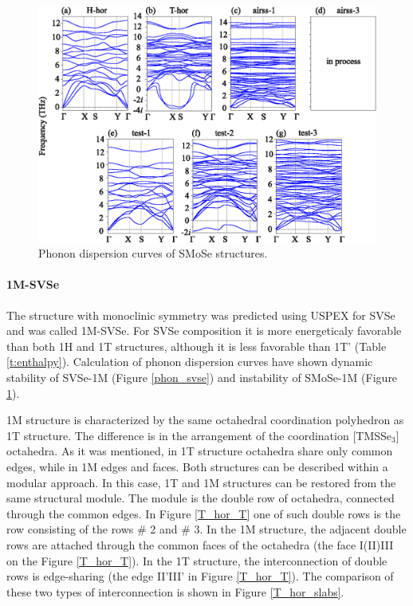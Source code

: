 \documentclass[a4paperm]{article}
\begin{document}
\begin{figure}[H]
	\includegraphics[width=\textwidth]{phon_smose.eps}
	\caption{Phonon dispersion curves of SMoSe structures.}
	\label{phon_smose}
\end{figure}







\paragraph{1M-SVSe}

The structure with monoclinic symmetry was predicted using USPEX for SVSe and was called 1M-SVSe. 
For SVSe composition it is more  energeticaly favorable than both 1H and 1T structures, although it is less favorable than 1T' (Table \ref{t:enthalpy}).
Calculation of phonon dispersion curves have shown dynamic stability of SVSe-1M (Figure \ref{phon_svse}) and instability of SMoSe-1M (Figure \ref{phon_smose}).

1M structure is characterized by the same octahedral coordination polyhedron as 1T structure.
The difference is in the arrangement of the coordination [TMSSe$_3$] octahedra.
As it was mentioned, in 1T structure octahedra share only common edges, while in 1M edges and faces.
Both structures can be described within a modular approach.
In this case, 1T and 1M structures can be restored from the same structural module.
The module is the double row of octahedra, connected through the common edges.
In Figure \ref{T_hor_T} one of such double rows is the row consisting of the rows \# 2 and \# 3.
In the 1M structure, the adjacent double rows are attached through the common faces  of the octahedra (the face I(II)III on the Figure \ref{T_hor_T}).
In the 1T structure, the interconnection of double rows is edge-sharing (the edge II'III' in Figure \ref{T_hor_T}). 
The comparison of these two types of interconnection is shown in Figure \ref{T_hor_slabs}.
\end{document}
